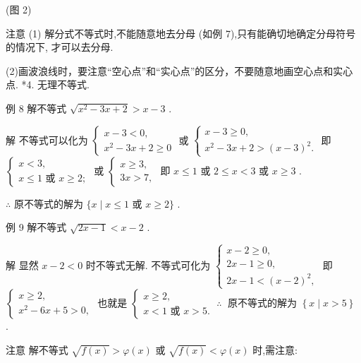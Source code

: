 \documentclass[10pt]{article}
\begin{document}
(图 2)

注意 (1) 解分式不等式时,不能随意地去分母 (如例 7),只有能确切地确定分母符号的情况下, 才可以去分母.

(2)画波浪线时，要注意“空心点”和“实心点”的区分，不要随意地画空心点和实心点. *4. 无理不等式.

例 8 解不等式 \(\sqrt{{x}^{2} - {3x} + 2} > x - 3\) .

解 不等式可以化为 \(\left\{  \begin{array}{l} x - 3 < 0, \\  {x}^{2} - {3x} + 2 \geq  0 \end{array}\right.\) 或 \(\left\{  \begin{array}{l} x - 3 \geq  0, \\  {x}^{2} - {3x} + 2 > {\left( x - 3\right) }^{2}. \end{array}\right.\) 即 \(\left\{  \begin{array}{l} x < 3, \\  x \leq  1\text{ 或 }x \geq  2; \end{array}\right.\) 或 \(\left\{  \begin{array}{l} x \geq  3, \\  {3x} > 7, \end{array}\right.\) 即 \(x \leq  1\) 或 \(2 \leq  x < 3\) 或 \(x \geq  3\) .

\(\therefore\) 原不等式的解为 \(\{ x \mid  x \leq  1\) 或 \(x \geq  2\}\) .

例 9 解不等式 \(\sqrt{{2x} - 1} < x - 2\) .

解 显然 \(x - 2 < 0\) 时不等式无解. 不等式可化为 \(\left\{  \begin{array}{l} x - 2 \geq  0, \\  {2x} - 1 \geq  0, \\  {2x} - 1 < {\left( x - 2\right) }^{2}, \end{array}\right.\) 即 \(\left\{  \begin{array}{l} x \geq  2, \\  {x}^{2} - {6x} + 5 > 0, \end{array}\right.\) 也就是 \(\left\{  {\begin{array}{l} x \geq  2, \\  x < 1\text{ 或 }x > 5. \end{array}\;\therefore \;\text{ 原不等式的解为 }\left\{  {x \mid  x > 5}\right\}  }\right.\) .

注意 解不等式 \(\sqrt{f\left( x\right) } > \varphi \left( x\right)\) 或 \(\sqrt{f\left( x\right) } < \varphi \left( x\right)\) 时,需注意:
\end{document}
